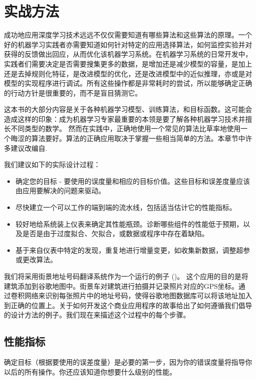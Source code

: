 \chapter{实战方法}
\label{chap:11}

成功地应用深度学习技术远远不仅仅需要知道有哪些算法和这些算法的原理。一个好的机器学习实践者亦需要知道如何针对特定的应用选择算法，如何监控实验并对获得的反馈做出回应，从而优化该机器学习系统。在机器学习系统的日常开发中，实践者们需要决定是否需要搜集更多的数据，是增加还是减少模型的容量，是加上还是去掉规则化特征，是改进模型的优化，还是改进模型中的近似推理，亦或是对模型的实现程序进行调试。所有这些操作都是非常耗时的尝试，所以能够确定正确的行动方针是很重要的，而不是盲目猜测它。

这本书的大部分内容是关于各种机器学习模型、训练算法，和目标函数。这可能会造成这样的印象：成为机器学习专家最重要的本领是要了解各种机器学习技术并擅长不同类型的数学。 然而在实践中，正确地使用一个常见的算法比草率地使用一个晦涩的算法要好。算法的正确应用取决于掌握一些相当简单的方法。本章节中许多建议改编自\cite{Ng ( 2015 )}.

我们建议如下的实际设计过程：
\begin{itemize}
\item 确定您的目标 - 要使用的误度量和相应的目标价值。这些目标和误差度量应该由应用要解决的问题来驱动。
\item 尽快建立一个可以工作的端到端的流水线，包括适当估计它的性能指标。
\item 较好地给系统装上仪表来确定其性能瓶颈。诊断哪些组件的性能低于预期，以及是否是由于过度拟合、欠拟合，或数据或程序中存在着缺陷。
\item 基于来自仪表中特定的发现，重复地进行增量变更，如收集新数据，调整超参或更改算法。
\end{itemize}

我们将采用街景地址号码翻译系统作为一个运行的例子 (\cite{ Goodfellow et al. , 2014d })。 这个应用的目的是将建筑添加到谷歌地图中。街景车对建筑进行拍摄并记录照片对应的GPS坐标。通过卷积网络来识别每张照片中的地址号码，使得谷歌地图数据库可以将该地址加入到正确的位置上。关于如何开发这个商业应用程序的故事给出了如何遵循我们倡导的设计方法的例子。我们现在来描述这个过程中的每个步骤。

\section{性能指标}

确定目标（根据要使用的误差度量）是必要的第一步，因为你的错误度量将指导你以后的所有操作。你还应该知道你想要什么级别的性能。

